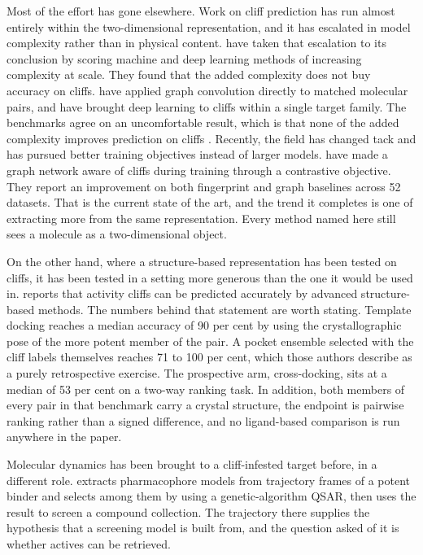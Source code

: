 Most of the effort has gone elsewhere. Work on cliff prediction has run almost entirely
within the two-dimensional representation, and it has escalated in model complexity
rather than in physical content. \citet{tamura2023} have taken that escalation to its
conclusion by scoring machine and deep learning methods of increasing complexity at
scale. They found that the added complexity does not buy accuracy on cliffs.
\citet{acgcn2022} have applied graph convolution directly to matched molecular pairs,
and \citet{elaiwat2025} have brought deep learning to cliffs within a single target
family. The benchmarks agree on an uncomfortable result, which is that none
of the added complexity improves prediction on cliffs
\citep{vantilborg2022,dablander2023,tamura2023}. Recently, the field has
changed tack and has pursued better training objectives instead of larger models.
\citet{cui2026} have made a graph network aware of cliffs during training through a
contrastive objective. They report an improvement on both fingerprint and graph
baselines across 52 datasets. That is the current state of the art, and the trend it
completes is one of extracting more from the same representation. Every method named
here still sees a molecule as a two-dimensional object.

On the other hand, where a structure-based representation has been tested on cliffs, it
has been tested in a setting more generous than the one it would be used in.
\citet{husby2015} reports that activity cliffs can be predicted accurately by advanced
structure-based methods. The numbers behind that statement are worth stating. Template
docking reaches a median accuracy of 90 per cent by using the crystallographic pose of
the more potent member of the pair. A pocket ensemble selected with the cliff labels
themselves reaches 71 to 100 per cent, which those authors describe as a purely
retrospective exercise. The prospective arm, cross-docking, sits at a median of 53 per
cent on a two-way ranking task. In addition, both members of every pair in that
benchmark carry a crystal structure, the endpoint is pairwise ranking rather than a
signed difference, and no ligand-based comparison is run anywhere in the paper.

Molecular dynamics has been brought to a cliff-infested target before, in a different
role. \citet{abudayah2022} extracts pharmacophore models from trajectory frames of a
potent binder and selects among them by using a genetic-algorithm QSAR, then uses the
result to screen a compound collection. The trajectory there supplies the hypothesis
that a screening model is built from, and the question asked of it is whether actives
can be retrieved.

